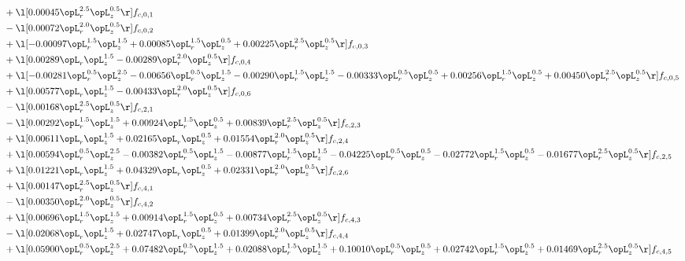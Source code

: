 \begin{alignat}{2}
& + \l[  0.00045 \opL_r^{2.5} \opL_z^{0.5}  \r] f_{c,0,1} \nonumber \\ 
& - \l[  0.00072 \opL_r^{2.0} \opL_z^{0.5}  \r] f_{c,0,2} \nonumber \\ 
& + \l[  -0.00097 \opL_r^{1.5} \opL_z^{1.5} +  0.00085 \opL_r^{1.5} \opL_z^{0.5} +  0.00225 \opL_r^{2.5} \opL_z^{0.5}  \r] f_{c,0,3} \nonumber \\ 
& + \l[  0.00289 \opL_r \opL_z^{1.5}   -0.00289 \opL_r^{2.0} \opL_z^{0.5}  \r] f_{c,0,4} \nonumber \\ 
& + \l[  -0.00281 \opL_r^{0.5} \opL_z^{2.5}   -0.00656 \opL_r^{0.5} \opL_z^{1.5}   -0.00290 \opL_r^{1.5} \opL_z^{1.5}   -0.00333 \opL_r^{0.5} \opL_z^{0.5} +  0.00256 \opL_r^{1.5} \opL_z^{0.5} +  0.00450 \opL_r^{2.5} \opL_z^{0.5}  \r] f_{c,0,5} \nonumber \\ 
& + \l[  0.00577 \opL_r \opL_z^{1.5}   -0.00433 \opL_r^{2.0} \opL_z^{0.5}  \r] f_{c,0,6} \nonumber \\ 
& - \l[  0.00168 \opL_r^{2.5} \opL_z^{0.5}  \r] f_{c,2,1} \nonumber \\ 
& - \l[  0.00292 \opL_r^{1.5} \opL_z^{1.5} +  0.00924 \opL_r^{1.5} \opL_z^{0.5} +  0.00839 \opL_r^{2.5} \opL_z^{0.5}  \r] f_{c,2,3} \nonumber \\ 
& + \l[  0.00611 \opL_r \opL_z^{1.5} +  0.02165 \opL_r \opL_z^{0.5} +  0.01554 \opL_r^{2.0} \opL_z^{0.5}  \r] f_{c,2,4} \nonumber \\ 
& + \l[  0.00594 \opL_r^{0.5} \opL_z^{2.5}   -0.00382 \opL_r^{0.5} \opL_z^{1.5}   -0.00877 \opL_r^{1.5} \opL_z^{1.5}   -0.04225 \opL_r^{0.5} \opL_z^{0.5}   -0.02772 \opL_r^{1.5} \opL_z^{0.5}   -0.01677 \opL_r^{2.5} \opL_z^{0.5}  \r] f_{c,2,5} \nonumber \\ 
& + \l[  0.01221 \opL_r \opL_z^{1.5} +  0.04329 \opL_r \opL_z^{0.5} +  0.02331 \opL_r^{2.0} \opL_z^{0.5}  \r] f_{c,2,6} \nonumber \\ 
& + \l[  0.00147 \opL_r^{2.5} \opL_z^{0.5}  \r] f_{c,4,1} \nonumber \\ 
& - \l[  0.00350 \opL_r^{2.0} \opL_z^{0.5}  \r] f_{c,4,2} \nonumber \\ 
& + \l[  0.00696 \opL_r^{1.5} \opL_z^{1.5} +  0.00914 \opL_r^{1.5} \opL_z^{0.5} +  0.00734 \opL_r^{2.5} \opL_z^{0.5}  \r] f_{c,4,3} \nonumber \\ 
& - \l[  0.02068 \opL_r \opL_z^{1.5} +  0.02747 \opL_r \opL_z^{0.5} +  0.01399 \opL_r^{2.0} \opL_z^{0.5}  \r] f_{c,4,4} \nonumber \\ 
& + \l[  0.05900 \opL_r^{0.5} \opL_z^{2.5} +  0.07482 \opL_r^{0.5} \opL_z^{1.5} +  0.02088 \opL_r^{1.5} \opL_z^{1.5} +  0.10010 \opL_r^{0.5} \opL_z^{0.5} +  0.02742 \opL_r^{1.5} \opL_z^{0.5} +  0.01469 \opL_r^{2.5} \opL_z^{0.5}  \r] f_{c,4,5} \nonumber \\ 

\end{alignat}

